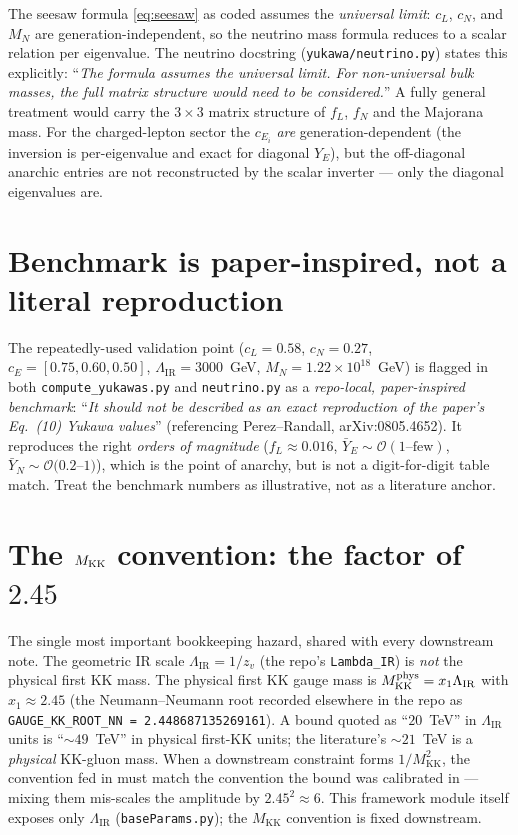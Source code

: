 \documentclass[11pt]{article}
\newcommand{\MKK}{M_{\mathrm{KK}}}
\newcommand{\LIR}{\Lambda_{\mathrm{IR}}}
\newcommand{\code}[1]{\texttt{#1}}
\theoremstyle{definition}
\begin{document}
The seesaw formula \eqref{eq:seesaw} as coded assumes the \emph{universal limit}:
$c_L$, $c_N$, and $M_N$ are generation-independent, so the neutrino mass formula
reduces to a scalar relation per eigenvalue. The neutrino docstring
(\code{yukawa/neutrino.py}) states this explicitly: ``\emph{The formula assumes the
universal limit. For non-universal bulk masses, the full matrix structure would
need to be considered.}'' A fully general treatment would carry the
$3\times3$ matrix structure of $f_L$, $f_N$ and the Majorana mass. For the
charged-lepton sector the $c_{E_i}$ \emph{are} generation-dependent (the
inversion is per-eigenvalue and exact for diagonal $Y_E$), but the off-diagonal
anarchic entries are not reconstructed by the scalar inverter --- only the
diagonal eigenvalues are.

\section{Benchmark is paper-inspired, not a literal reproduction}
\label{sec:benchmark}

The repeatedly-used validation point ($c_L=0.58$, $c_N=0.27$,
$c_E=[0.75,0.60,0.50]$, $\LIR=3000$~GeV, $M_N=1.22\times10^{18}$~GeV) is flagged
in both \code{compute\_yukawas.py} and \code{neutrino.py} as a \emph{repo-local,
paper-inspired benchmark}: ``\emph{It should not be described as an exact
reproduction of the paper's Eq.~(10) Yukawa values}'' (referencing Perez--Randall,
arXiv:0805.4652). It reproduces the right \emph{orders of magnitude} ($f_L\approx
0.016$, $\bar Y_E\sim\mathcal{O}(1\text{--few})$, $\bar Y_N\sim\mathcal{O}(0.2$--$1)$),
which is the point of anarchy, but is not a digit-for-digit table match. Treat the
benchmark numbers as illustrative, not as a literature anchor.

\section{The $M_{\rm KK}$ convention: the factor of $2.45$}
\label{sec:mkkconv}

The single most important bookkeeping hazard, shared with every downstream note.
The geometric IR scale $\LIR=1/z_v$ (the repo's \code{Lambda\_IR}) is \emph{not}
the physical first KK mass. The physical first KK gauge mass is
$\MKK^{\rm phys}=x_1\LIR$ with $x_1\approx2.45$ (the Neumann--Neumann root
recorded elsewhere in the repo as \code{GAUGE\_KK\_ROOT\_NN =
2.448687135269161}). A bound quoted as ``$20$~TeV'' in $\LIR$ units is
``$\sim49$~TeV'' in physical first-KK units; the literature's $\sim21$~TeV is a
\emph{physical} KK-gluon mass. When a downstream constraint forms $1/\MKK^2$, the
convention fed in must match the convention the bound was calibrated in --- mixing
them mis-scales the amplitude by $2.45^2\approx6$. This framework module itself
exposes only $\LIR$ (\code{baseParams.py}); the $\MKK$ convention is fixed
downstream.
\end{document}
